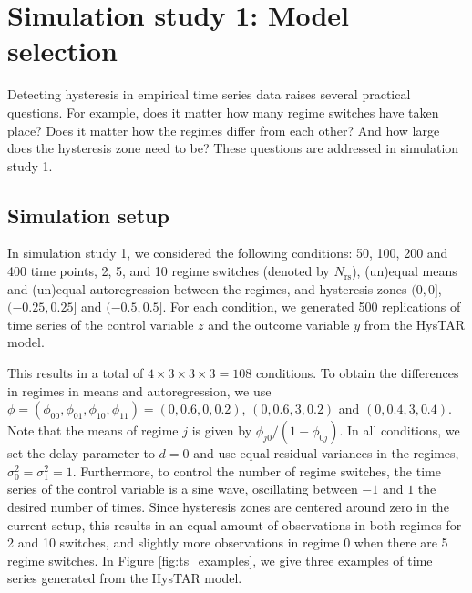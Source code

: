 \documentclass{article}
\begin{document}
\section{Simulation study 1: Model selection}
\label{sec:simulation_study_1}
Detecting hysteresis in empirical time series data raises several practical questions.
For example, does it matter how many regime switches have taken place?
Does it matter how the regimes differ from each other?
And how large does the hysteresis zone need to be?
These questions are addressed in simulation study 1.

\subsection{Simulation setup}
In simulation study 1, we considered the following conditions: 50, 100, 200 and 400 time points, 2, 5, and 10 regime switches (denoted by $N_{\mathrm{rs}}$), (un)equal means and (un)equal autoregression between the regimes, and hysteresis zones $(0, 0]$, $(-0.25, 0.25]$ and $(-0.5, 0.5]$. For each condition, we generated 500 replications of time series of the control variable $z$ and the outcome variable $y$ from the HysTAR model.

This results in a total of $4 \times 3 \times 3 \times 3 = 108$ conditions.
To obtain the differences in regimes in means and autoregression, we use $\phi = (\phi_{00}, \phi_{01}, \phi_{10}, \phi_{11}) = (0, 0.6, 0, 0.2)$, $(0, 0.6, 3, 0.2)$ and $(0, 0.4, 3, 0.4)$. Note that the means of regime $j$ is given by $\phi_{j0}/(1 - \phi_{0j})$.
In all conditions, we set the delay parameter to $d = 0$ and use equal residual variances in the regimes, $\sigma_0^2 = \sigma_1^2 = 1$. 
Furthermore, to control the number of regime switches, the time series of the control variable is a sine wave, oscillating between $-1$ and $1$ the desired number of times.
Since hysteresis zones are centered around zero in the current setup, this results in an equal amount of observations in both regimes for 2 and 10 switches, and slightly more observations in regime 0 when there are 5 regime switches.
In Figure \ref{fig:ts_examples}, we give three examples of time series generated from the HysTAR model.
\end{document}

